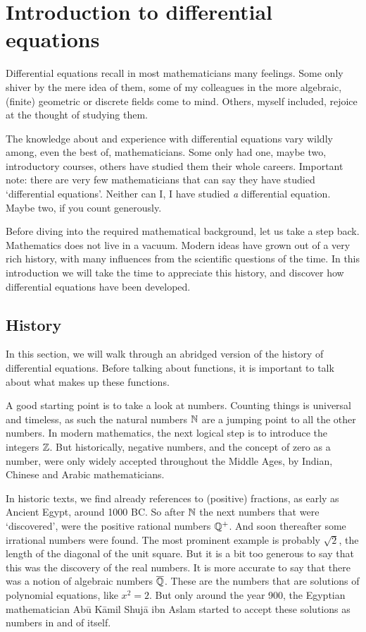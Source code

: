 

\chapter{Introduction to differential equations}

Differential equations recall in most mathematicians many feelings. Some only shiver by the mere idea of them, some of my colleagues in the more algebraic, (finite) geometric or discrete fields come to mind. Others, myself included, rejoice at the thought of studying them.

The knowledge about and experience with differential equations vary wildly among, even the best of, mathematicians. Some only had one, maybe two, introductory courses, others have studied them their whole careers. Important note: there are very few mathematicians that can say they have studied `differential equations'. Neither can I, I have studied \emph{a} differential equation. Maybe two, if you count generously.

Before diving into the required mathematical background, let us take a step back. Mathematics does not live in a vacuum. Modern ideas have grown out of a very rich history, with many influences from the scientific questions of the time. In this introduction we will take the time to appreciate this history, and discover how differential equations have been developed.

\section{History}

In this section, we will walk through an abridged version of the history of differential equations. Before talking about functions, it is important to talk about what makes up these functions.

A good starting point is to take a look at numbers. Counting things is universal and timeless, as such the natural numbers $\mathbb{N}$ are a jumping point to all the other numbers. In modern mathematics, the next logical step is to introduce the integers $\mathbb{Z}$. But historically, negative numbers, and the concept of zero as a number, were only widely accepted throughout the Middle Ages, by Indian, Chinese and Arabic mathematicians.

In historic texts, we find already references to (positive) fractions, as early as Ancient Egypt, around 1000 BC. So after $\mathbb{N}$ the next numbers that were `discovered', were the positive rational numbers $\mathbb{Q}^+$. And soon thereafter some irrational numbers were found. The most prominent example is probably $\sqrt{2}$, the length of the diagonal of the unit square. But it is a bit too generous to say that this was the discovery of the real numbers. It is more accurate to say that there was a notion of algebraic numbers $\overline{\mathbb{Q}}$. These are the numbers that are solutions of polynomial equations, like $x^2 = 2$. But only around the year 900, the Egyptian mathematician Abū Kāmil Shujā ibn Aslam started to accept these solutions as numbers in and of itself.

